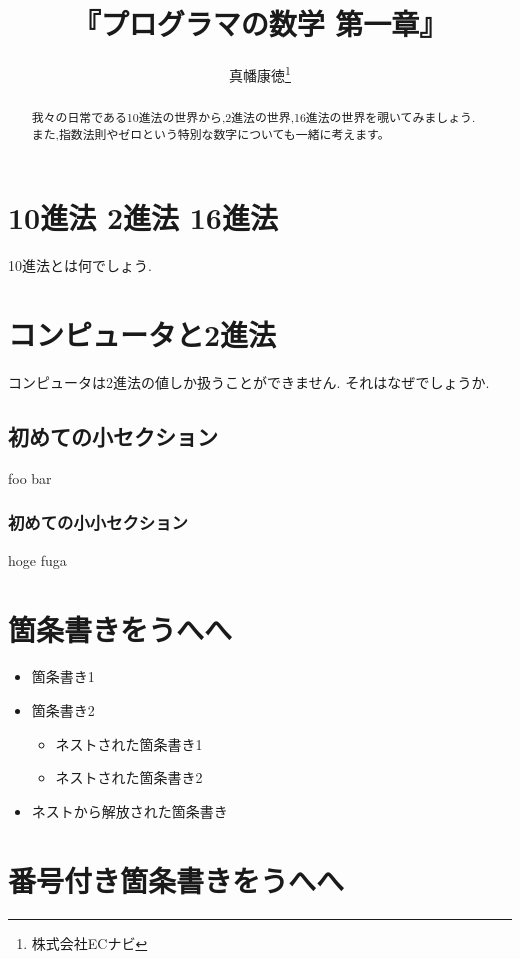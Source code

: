 \documentclass[10pt, twocolumn]{jarticle}
\title{『プログラマの数学 第一章』}
\author{真幡康徳\thanks{株式会社ECナビ}}
\begin{document}
\maketitle
\begin{abstract}
我々の日常である10進法の世界から,2進法の世界,16進法の世界を覗いてみましょう.
また,指数法則やゼロという特別な数字についても一緒に考えます。
\end{abstract}

\section{10進法 2進法 16進法}

10進法とは何でしょう.

\section{コンピュータと2進法}

コンピュータは2進法の値しか扱うことができません.
それはなぜでしょうか.

\subsection{初めての小セクション}

foo bar

\subsubsection{初めての小小セクション}

hoge fuga

\section{箇条書きをうへへ}

\begin{itemize}
  \item 箇条書き1
  \item 箇条書き2
  \begin{itemize}
    \item ネストされた箇条書き1
    \item ネストされた箇条書き2
  \end{itemize}
  \item ネストから解放された箇条書き
\end{itemize}

\section{番号付き箇条書きをうへへ}
\end{document}
